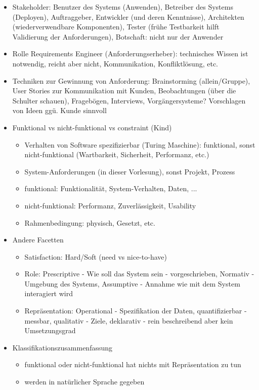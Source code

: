 \documentclass[paper=a4, fontsize=11pt]{scrartcl} %
\numberwithin{equation}{section} %
\numberwithin{figure}{section} %
\numberwithin{table}{section} %
\begin{document}
\begin{itemize}
  \item Stakeholder: Benutzer des Systems (Anwenden), Betreiber des Systems (Deployen), Auftraggeber, Entwickler (und deren Kenntnisse), Architekten (wiederverwendbare Komponenten), Tester (frühe Testbarkeit hilft Validierung der Anforderungen), Botschaft: nicht nur der Anwender
  \item Rolle Requirements Engineer (Anforderungserheber): technisches Wissen ist notwendig, reicht aber nicht, Kommunikation, Konfliktlösung, etc.
  \item Techniken zur Gewinnung von Anforderung: Brainstorming (allein/Gruppe), User Stories zur Kommunikation mit Kunden, Beobachtungen (über die Schulter schauen), Fragebögen, Interviews, Vorgängersysteme? Vorschlagen von Ideen ggü. Kunde sinnvoll
  \item Funktional vs nicht-funktional vs constraint (Kind)
  \begin{itemize}
    \item Verhalten von Software spezifizierbar (Turing Maschine): funktional, sonst nicht-funktional (Wartbarkeit, Sicherheit, Performanz, etc.)
    \item System-Anforderungen (in dieser Vorlesung), sonst Projekt, Prozess
    \item funktional: Funktionalität, System-Verhalten, Daten, ...
    \item nicht-funktional: Performanz, Zuverlässigkeit, Usability
    \item Rahmenbedingung: physisch, Gesetzt, etc.
  \end{itemize}
  \item Andere Facetten
  \begin{itemize}
    \item Satisfaction: Hard/Soft (need vs nice-to-have)
    \item Role: Prescriptive - Wie soll das System sein - vorgeschrieben, Normativ - Umgebung des Systems, Assumptive - Annahme wie mit dem System interagiert wird
    \item Repräsentation: Operational - Spezifikation der Daten, quantifizierbar - messbar, qualitativ - Ziele, deklarativ - rein beschreibend aber kein Umsetzungsgrad
  \end{itemize}
  \item Klassifikationszusammenfassung
  \begin{itemize}
    \item funktional oder nicht-funktional hat nichts mit Repräsentation zu tun
    \item werden in natürlicher Sprache gegeben

\end{itemize}
\end{itemize}
\end{document}
